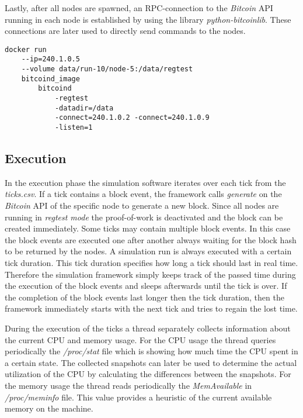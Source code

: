 Lastly, after all nodes are spawned, an RPC-connection to the \textit{Bitcoin} API running in each node is established by using the library \textit{python-bitcoinlib}.
These connections are later used to directly send commands to the nodes.

\begin{minipage}{\linewidth}
\begin{lstlisting}[caption=Simplified version of how a node is started with \textit{Docker} and \textit{bitcoind}, label={lst:docker_create}, basicstyle=\ttfamily, captionpos=b]
docker run
	--ip=240.1.0.5
	--volume data/run-10/node-5:/data/regtest
	bitcoind_image
		bitcoind
			-regtest
			-datadir=/data
			-connect=240.1.0.2 -connect=240.1.0.9
			-listen=1
\end{lstlisting}
\end{minipage}
	
\subsection{Execution}

In the execution phase the simulation software iterates over each tick from the \textit{ticks.csv}.
If a tick contains a block event, the framework calls \textit{generate} on the \textit{Bitcoin} API of the specific node to generate a new block.
Since all nodes are running in \textit{regtest mode} the proof-of-work is deactivated and the block can be created immediately.
Some ticks may contain multiple block events.
In this case the block events are executed one after another always waiting for the block hash to be returned by the nodes.
A simulation run is always executed with a certain tick duration.
This tick duration specifies how long a tick should last in real time.
Therefore the simulation framework simply keeps track of the passed time during the execution of the block events and sleeps afterwards until the tick is over.
If the completion of the block events last longer then the tick duration, then the framework immediately starts with the next tick and tries to regain the lost time.

During the execution of the ticks a thread separately collects information about the current CPU and memory usage.
For the CPU usage the thread queries periodically the \textit{/proc/stat} file which is showing how much time the CPU spent in a certain state. 
The collected snapshots can later be used to determine the actual utilization of the CPU by calculating the differences between the snapshots.
For the memory usage the thread reads periodically the \textit{MemAvailable} in \textit{/proc/meminfo} file.
This value provides a heuristic of the current available memory on the machine.

